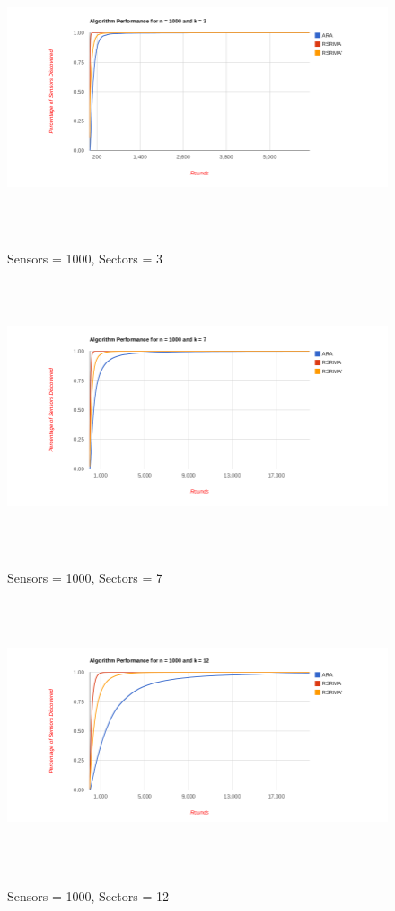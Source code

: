 \begin{figure}[ht]
\caption{Sensors = 1000, Sectors = 3}
\includegraphics[height = 8cm]{pics/graph1000k3.png}\\[0.5cm]    
\label{fig:n1000k3}
\end{figure}

\begin{figure}[ht]
\caption{Sensors = 1000, Sectors = 7}
\includegraphics[height = 8cm]{pics/graph1000k7.png}\\[0.5cm]   
\label{fig:n1000k7} 
\end{figure}

\begin{figure}[ht]
\caption{Sensors = 1000, Sectors = 12}
\includegraphics[height = 8cm]{pics/graph1000k12.png}\\[0.5cm] 
\label{fig:n1000k12}   
\end{figure}

